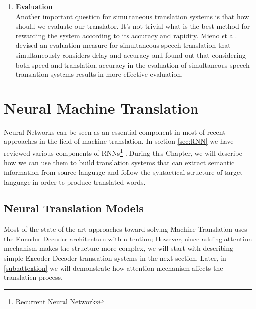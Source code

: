 \documentclass{sfuthesis}
\begin{document}
\begin{enumerate}
    \item \textbf{Evaluation}\\
    Another important question for simultaneous translation systems is that how should we evaluate our translator. It's not trivial what is the best method for rewarding the system according to its accuracy and rapidity. Mieno et al. \cite{mieno:2015:interspeech} devised an evaluation measure for simultaneous speech translation that simultaneously considers delay and accuracy and found out that considering both speed and translation accuracy in the evaluation of simultaneous speech translation systems results in more effective evaluation.
\end{enumerate}


\chapter{Neural Machine Translation} \label{chap:NMT}
Neural Networks can be seen as an essential component in most of recent approaches in the field of machine translation. In section \ref{sec:RNN} we have reviewed various components of RNNs\footnote{Recurrent Neural Networks} . During this Chapter, we will describe how we can use them to build translation systems that can extract semantic information from source language and follow the syntactical structure of target language in order to produce translated words.

\section{Neural Translation Models} \label{sec:NTM}
Most of the state-of-the-art approaches toward solving Machine Translation uses the Encoder-Decoder architecture with attention; However, since adding attention mechanism makes the structure more complex, we will start with describing simple Encoder-Decoder translation systems in the next section. Later, in \ref{sub:attention} we will demonstrate how attention mechanism affects the translation process.
\end{document}
